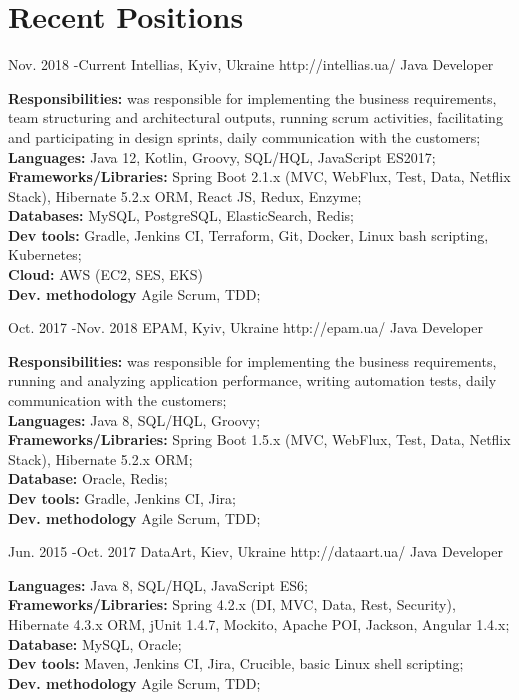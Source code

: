 \documentclass[10pt]{article} %
\begin{document}
\section{Recent Positions}
\job
{Nov. 2018 -}{Current}
{Intellias, Kyiv, Ukraine}
{http://intellias.ua/}
{Java Developer}
{\rule{0mm}{5mm}\textbf{Responsibilities:}  was responsible for implementing the business requirements, team structuring and architectural outputs, running scrum activities, facilitating and participating in design sprints, daily communication with the customers;
\\ \textbf{Languages:}  Java 12, Kotlin, Groovy,  SQL/HQL, JavaScript ES2017;
\\  \textbf{Frameworks/Libraries:}  Spring Boot 2.1.x (MVC, WebFlux, Test, Data, Netflix Stack), Hibernate 5.2.x ORM, React JS, Redux, Enzyme;
\\ \textbf{Databases:}  MySQL, PostgreSQL, ElasticSearch, Redis;
\\  \textbf{Dev tools:} Gradle, Jenkins CI, Terraform, Git, Docker, Linux bash scripting, Kubernetes;
\\ \textbf{Cloud:} AWS (EC2, SES, EKS)
\\  \textbf{Dev. methodology} Agile Scrum, TDD;
 }
 
\job
{Oct. 2017 -}{Nov. 2018}
{EPAM, Kyiv, Ukraine}
{http://epam.ua/}
{Java Developer}
{
\rule{0mm}{5mm}\textbf{Responsibilities:}  was responsible for implementing the business requirements, running and analyzing application performance, writing automation tests, daily communication with the customers;
\\ \textbf{Languages:}  Java 8, SQL/HQL, Groovy;
\\  \textbf{Frameworks/Libraries:}  Spring Boot 1.5.x (MVC, WebFlux, Test, Data, Netflix Stack), Hibernate 5.2.x ORM;
\\ \textbf{Database:}  Oracle, Redis;
\\  \textbf{Dev tools:} Gradle, Jenkins CI, Jira;
\\  \textbf{Dev. methodology} Agile Scrum, TDD;
 }

\job
{Jun. 2015 -}{Oct. 2017}
{DataArt, Kiev, Ukraine}
{http://dataart.ua/}
{Java Developer}
{

\rule{0mm}{5mm}\textbf{Languages:}  Java 8, SQL/HQL, JavaScript ES6;
\\  \textbf{Frameworks/Libraries:}  Spring 4.2.x (DI, MVC, Data, Rest, Security), Hibernate 4.3.x ORM, jUnit 1.4.7, Mockito, Apache POI, Jackson, Angular 1.4.x;
\\ \textbf{Database:}  MySQL, Oracle;
\\  \textbf{Dev tools:} Maven, Jenkins CI, Jira, Crucible, basic Linux shell scripting;
\\  \textbf{Dev. methodology} Agile Scrum, TDD;
 }
\end{document}
